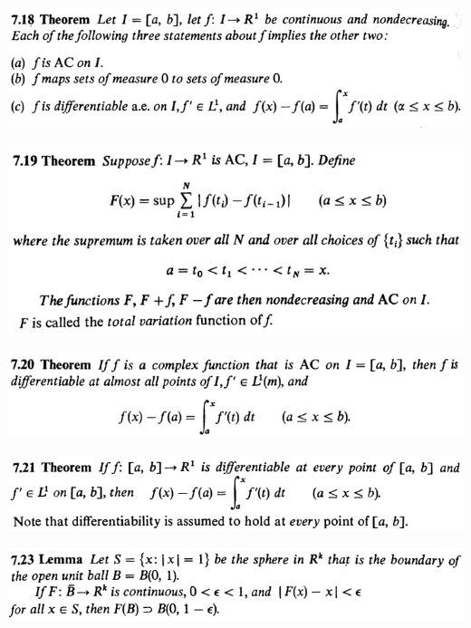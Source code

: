 \documentclass[12pt]{article}
\begin{document}
		\begin{center}
		\includegraphics{7ponto18}
		\end{center}

		\begin{center}
		\includegraphics{7ponto19}
		\end{center}

		\begin{center}
		\includegraphics{7ponto20}
		\end{center}

		\begin{center}
		\includegraphics{7ponto21}
		\end{center}

		\begin{center}
		\includegraphics{7ponto23}
		\end{center}
\end{document}
